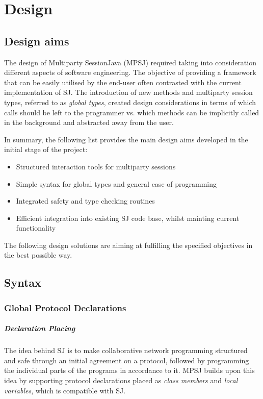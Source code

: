 \cleardoublepage
\chapter{Design}
\label{ch:design}

\section{Design aims}
\label{sec:designaims}

The design of Multiparty SessionJava (MPSJ) required taking into consideration different aspects of software engineering. The objective of providing a framework that can be easily utilised by the end-user often contrasted with the current implementation of SJ. The introduction of new methods and multiparty session types, referred to as \textit{global types}, created design considerations in terms of which calls should be left to the programmer vs. which methods can be implicitly called in the background and abstracted away from the user. 

In summary, the following list provides the main design aims developed in the initial stage of the project:

\begin{itemize}
\item Structured interaction tools for multiparty sessions
\item Simple syntax for global types and general ease of programming
\item Integrated safety and type checking routines
\item Efficient integration into existing SJ code base, whilst mainting current functionality
\end{itemize}

The following design solutions are aiming at fulfilling the specified objectives in the best possible way.


\section{Syntax}
\label{sec:syntaxdesign}

\subsection{Global Protocol Declarations}
\label{subsec:globprotdecl}

\paragraph*{Declaration Placing}
The idea behind SJ is to make collaborative network programming structured and safe through an initial agreement on a protocol, followed by programming the individual parts of the programs in accordance to it. MPSJ builds upon this idea by supporting protocol declarations placed as \textit{class members} and \textit{local variables}, which is compatible with SJ. 

